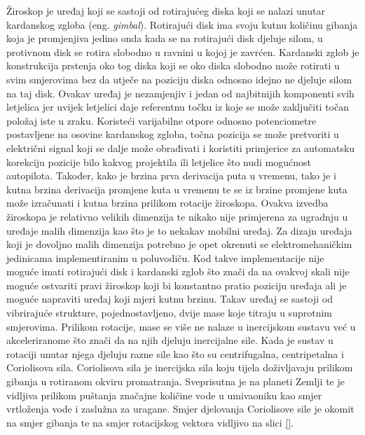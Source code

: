 \documentclass[times, utf8, diplomski]{fer}
\begin{document}
Žiroskop je uređaj koji se sastoji od rotirajućeg diska koji se nalazi unutar kardanskog zgloba (eng. \textit{gimbal}). Rotirajući
disk ima svoju kutnu količinu gibanja koja je promjenjiva jedino onda kada se na rotirajući disk djeluje silom, u protivnom
disk se rotira slobodno u ravnini u kojoj je zavrćen. Kardanski zglob je konstrukcija prstenja oko tog diska koji se oko diska
slobodno može rotirati u svim smjerovima bez da utječe na poziciju diska odnosno idejno ne djeluje silom na taj disk. Ovakav uređaj
je nezamjenjiv i jedan od najbitnijih komponenti svih letjelica jer uvijek letjelici daje referentnu točku iz koje se može
zaključiti točan položaj iste u zraku. Koristeći varijabilne otpore odnosno potenciometre postavljene na osovine kardanskog zgloba,
točna pozicija se može pretvoriti u električni signal koji se dalje može obrađivati i koristiti primjerice za
automatsku korekciju pozicije bilo kakvog projektila ili letjelice što nudi mogućnost autopilota. Također, kako je brzina prva
derivacija puta u vremenu, tako je i kutna brzina derivacija promjene kuta u vremenu te se iz brzine promjene kuta može izračunati
i kutna brzina prilikom rotacije žiroskopa. Ovakva izvedba žiroskopa je
relativno velikih dimenzija te nikako nije primjerena za ugradnju u uređaje malih dimenzija kao što je to nekakav mobilni uređaj.
Za dizajn uređaja koji je dovoljno malih dimenzija potrebno je opet okrenuti se elektromehaničkim jedinicama implementiranim u poluvodiču.
Kod takve implementacije nije moguće imati rotirajući disk i kardanski zglob što znači da na ovakvoj skali nije moguće ostvariti 
pravi žiroskop koji bi konstantno pratio poziciju uređaja ali je moguće napraviti uređaj koji mjeri kutnu brzinu.
Takav uređaj se sastoji od vibrirajuće strukture, pojednostavljeno, dvije mase koje titraju u suprotnim smjerovima.
Prilikom rotacije, mase se više ne nalaze u inercijskom sustavu već u akceleriranome što znači da na njih djeluju inercijalne sile.
Kada je sustav u rotaciji unutar njega djeluju razne sile kao što su centrifugalna, centripetalna i Coriolisova sila.
Coriolisova sila je inercijska sila koju tijela doživljavaju prilikom gibanja u rotiranom okviru promatranja. Sveprisutna je na 
planeti Zemlji te je vidljiva prilikom puštanja značajne količine vode u umivaoniku kao smjer vrtloženja vode i zaslužna za
uragane. Smjer djelovanja Coriolisove sile je okomit na smjer gibanja te na smjer rotacijskog vektora vidljivo na slici \ref{}.

\end{document}

